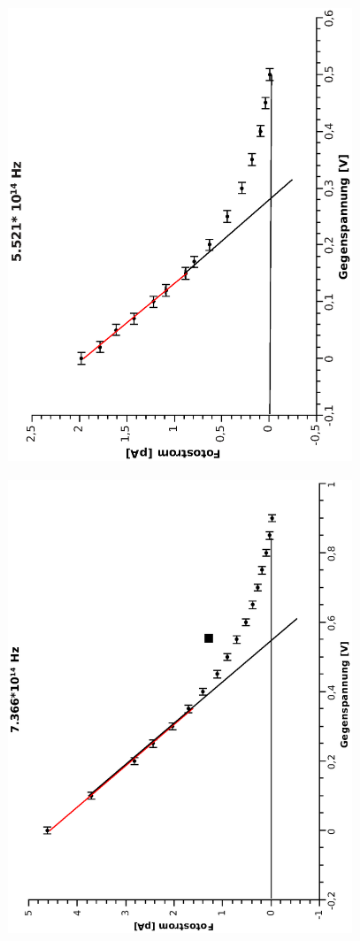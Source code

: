 \documentclass[12pt,a4paper,twopage]{article}
\begin{document}
\begin{center}
\begin{figure}[H]
\begin{subfigure}{0.48\linewidth}
\includegraphics[width=0.75\linewidth, angle=-90]{5521.eps}
\end{subfigure}
\begin{subfigure}{0.48\textwidth}
\includegraphics[width=0.75\linewidth, angle=-90]{7366.eps}

\end{subfigure}
\end{figure}
\end{center}
\end{document}
